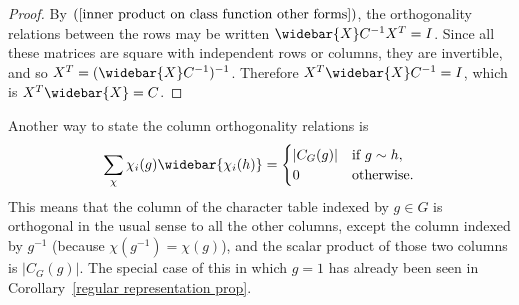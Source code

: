 \begin{proof}
By $(\ref{inner product on class function other forms})$, the orthogonality relations between the rows may be written $\widebar{X}C^{-1}X^T=I$. Since all these matrices are square with independent rows or columns, they are invertible, and so $X^T=(\widebar{X}C^{-1})^{-1}$. Therefore $X^T\widebar{X}C^{-1}=I$, which is $X^T\widebar{X}=C$.
\end{proof}
Another way to state the column orthogonality relations is
\[\sum_{\chi}\chi_i(g)\widebar{\chi_i(h)}=\begin{cases}
|C_G(g)|&\text{if $g\sim h$},\\
0&\text{otherwise}.
\end{cases}\]
This means that the column of the character table indexed by $g\in G$ is orthogonal in the usual sense to all the other columns, except the column indexed by $g^{-1}$ (because $\chi(g^{-1})=\chi(g)$), and the scalar product of those two columns is $|C_G(g)|$. The special case of this in which $g=1$ has already been seen in Corollary~\ref{regular representation prop}.
